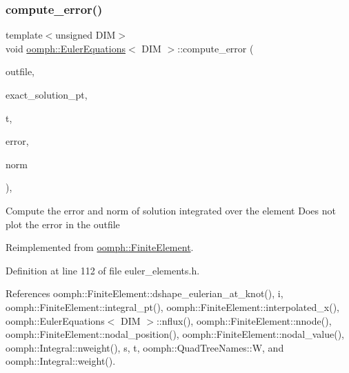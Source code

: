 \mbox{\label{classoomph_1_1EulerEquations_a3e277760413c4b27b3eae150b1d212b1}} 
\subsubsection{\texorpdfstring{compute\+\_\+error()}{compute\_error()}}
{\footnotesize\ttfamily template$<$unsigned D\+IM$>$ \\
void \hyperlink{classoomph_1_1EulerEquations}{oomph\+::\+Euler\+Equations}$<$ D\+IM $>$\+::compute\+\_\+error (\begin{DoxyParamCaption}\item[{std\+::ostream \&}]{outfile,  }\item[{\hyperlink{classoomph_1_1FiniteElement_ad4ecf2b61b158a4b4d351a60d23c633e}{Finite\+Element\+::\+Unsteady\+Exact\+Solution\+Fct\+Pt}}]{exact\+\_\+solution\+\_\+pt,  }\item[{const double \&}]{t,  }\item[{\hyperlink{classoomph_1_1Vector}{Vector}$<$ double $>$ \&}]{error,  }\item[{\hyperlink{classoomph_1_1Vector}{Vector}$<$ double $>$ \&}]{norm }\end{DoxyParamCaption})\hspace{0.3cm}{\ttfamily [inline]}, {\ttfamily [virtual]}}

Compute the error and norm of solution integrated over the element Does not plot the error in the outfile 

Reimplemented from \hyperlink{classoomph_1_1FiniteElement_a6c1220af04b60c1a1c34b44495188daf}{oomph\+::\+Finite\+Element}.



Definition at line 112 of file euler\+\_\+elements.\+h.



References oomph\+::\+Finite\+Element\+::dshape\+\_\+eulerian\+\_\+at\+\_\+knot(), i, oomph\+::\+Finite\+Element\+::integral\+\_\+pt(), oomph\+::\+Finite\+Element\+::interpolated\+\_\+x(), oomph\+::\+Euler\+Equations$<$ D\+I\+M $>$\+::nflux(), oomph\+::\+Finite\+Element\+::nnode(), oomph\+::\+Finite\+Element\+::nodal\+\_\+position(), oomph\+::\+Finite\+Element\+::nodal\+\_\+value(), oomph\+::\+Integral\+::nweight(), s, t, oomph\+::\+Quad\+Tree\+Names\+::W, and oomph\+::\+Integral\+::weight().

